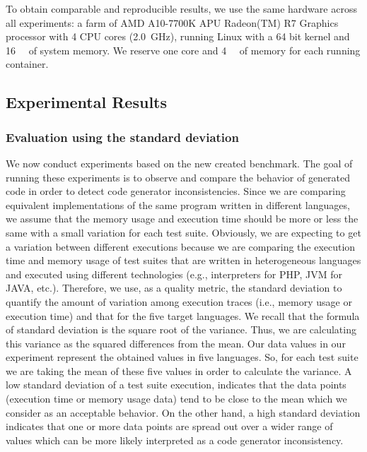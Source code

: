 To obtain comparable and reproducible results, we use the same hardware across all experiments: a farm of AMD A10-7700K APU Radeon(TM) R7 Graphics processor with 4 CPU cores (\SI{2.0}{\GHz}), running Linux with a 64 bit kernel and \SI{16}{\giga\byte} of system memory. We reserve one core and \SI{4}{\giga\byte} of memory for each running container. 

\subsection{Experimental Results}
\subsubsection{Evaluation using the standard deviation}
We now conduct experiments based on the new created benchmark. 
The goal of running these experiments is to observe and compare the behavior of generated code in order to detect code generator inconsistencies.
Since we are comparing equivalent implementations of the same program written in different languages, we assume that the memory usage and execution time should be more or less the same with a small variation for each test suite. Obviously, we are expecting to get a variation between different executions because we are comparing the execution time and memory usage of test suites that are written in heterogeneous languages and executed using different technologies (e.g., interpreters for PHP, JVM for JAVA, etc.). 
Therefore, we use, as a quality metric, the standard deviation to quantify the amount of variation among execution traces (i.e., memory usage or execution time) and that for the five target languages. We recall that the formula of standard deviation is the square root of the variance. Thus, we are calculating this variance as the squared differences from the mean. Our data values in our experiment represent the obtained values in five languages. So, for each test suite we are taking the mean of these five values in order to calculate the variance.
A low standard deviation of a test suite execution, indicates that the data points (execution time or memory usage data) tend to be close to the mean which we consider as an acceptable behavior.  
On the other hand, a high standard deviation indicates that one or more data points are spread out over a wider range of values which can be more likely interpreted as a code generator inconsistency. 


